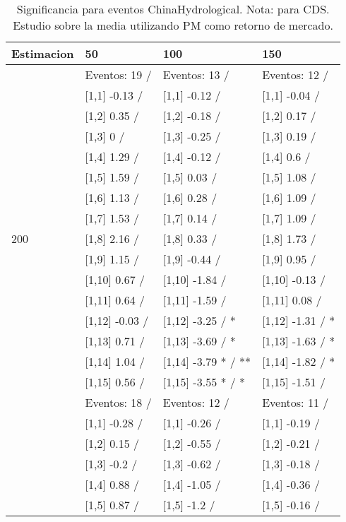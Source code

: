 \begin{table}

\caption{Significancia para eventos ChinaHydrological. Nota: para CDS. Estudio sobre la media utilizando PM como retorno de mercado.}
\centering
\begin{tabular}[t]{llll}
\toprule
Estimacion & 50 & 100 & 150\\
\midrule
 & Eventos:  19 / & Eventos:  13 / & Eventos:  12 /\\
 & {}[1,1] -0.13  / & {}[1,1] -0.12  / & {}[1,1] -0.04  /\\
 & {}[1,2] 0.35  / & {}[1,2] -0.18  / & {}[1,2] 0.17  /\\
 & {}[1,3] 0  / & {}[1,3] -0.25  / & {}[1,3] 0.19  /\\
 & {}[1,4] 1.29  / & {}[1,4] -0.12  / & {}[1,4] 0.6  /\\
\addlinespace
 & {}[1,5] 1.59  / & {}[1,5] 0.03  / & {}[1,5] 1.08  /\\
 & {}[1,6] 1.13  / & {}[1,6] 0.28  / & {}[1,6] 1.09  /\\
 & {}[1,7] 1.53  / & {}[1,7] 0.14  / & {}[1,7] 1.09  /\\
200 & {}[1,8] 2.16  / & {}[1,8] 0.33  / & {}[1,8] 1.73  /\\
 & {}[1,9] 1.15  / & {}[1,9] -0.44  / & {}[1,9] 0.95  /\\
\addlinespace
 & {}[1,10] 0.67  / & {}[1,10] -1.84  / & {}[1,10] -0.13  /\\
 & {}[1,11] 0.64  / & {}[1,11] -1.59  / & {}[1,11] 0.08  /\\
 & {}[1,12] -0.03  / & {}[1,12] -3.25  / * & {}[1,12] -1.31  / *\\
 & {}[1,13] 0.71  / & {}[1,13] -3.69  / * & {}[1,13] -1.63  / *\\
 & {}[1,14] 1.04  / & {}[1,14] -3.79 * / ** & {}[1,14] -1.82  / *\\
\addlinespace
 & {}[1,15] 0.56  / & {}[1,15] -3.55 * / * & {}[1,15] -1.51  /\\
 & Eventos:  18 / & Eventos:  12 / & Eventos:  11 /\\
 & {}[1,1] -0.28  / & {}[1,1] -0.26  / & {}[1,1] -0.19  /\\
 & {}[1,2] 0.15  / & {}[1,2] -0.55  / & {}[1,2] -0.21  /\\
 & {}[1,3] -0.2  / & {}[1,3] -0.62  / & {}[1,3] -0.18  /\\
\addlinespace
 & {}[1,4] 0.88  / & {}[1,4] -1.05  / & {}[1,4] -0.36  /\\
 & {}[1,5] 0.87  / & {}[1,5] -1.2  / & {}[1,5] -0.16  /\\

\end{tabular}
\end{table}

